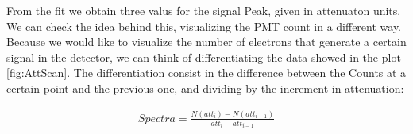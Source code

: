 \begin{figure}[hbtp]
\centering
{}
\end{figure}


From the fit we obtain three valus for the signal Peak, given in attenuaton units.
We can check the idea behind this, visualizing the PMT count in a different way. Because we would like to visualize the number of electrons that generate a certain signal in the detector, we can think of differentiating the data showed in the plot \ref{fig:AttScan}. The differentiation consist in the difference between the Counts at a certain point and the previous one, and dividing by the increment in attenuation:

\begin{align*}
Spectra = \frac{N(att_{i}) - N(att_{i-1})}{att_{i} - att_{i-1}} 
\end{align*}

